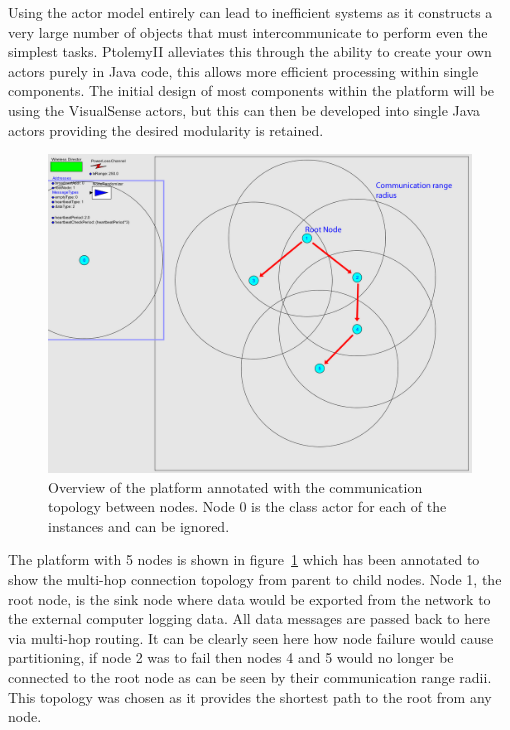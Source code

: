 \documentclass[authoryearcitations]{UoYCSproject}
\begin{document}
Using the actor model entirely can lead to inefficient systems as it constructs a very large number of objects that must intercommunicate to perform even the simplest tasks. PtolemyII alleviates this through the ability to create your own actors purely in Java code, this allows more efficient processing within single components. The initial design of most components within the platform will be using the VisualSense actors, but this can then be developed into single Java actors providing the desired modularity is retained.

\begin{figure}
 \centering
    \includegraphics[width=\textwidth]{figures/nodeModel.png}
    \caption[Overview of the platform annotated with the communication topology between nodes.]{Overview of the platform annotated with the communication topology between nodes. Node 0 is the class actor for each of the instances and can be ignored.}
    \label{fig:nodeModel}
\end{figure}

The platform with 5 nodes is shown in figure~\ref{fig:nodeModel} which has been annotated to show the multi-hop connection topology from parent to child nodes. Node 1, the root node, is the sink node where data would be exported from the network to the external computer logging data. All data messages are passed back to here via multi-hop routing. It can be clearly seen here how node failure would cause partitioning, if node 2 was to fail then nodes 4 and 5 would no longer be connected to the root node as can be seen by their communication range radii. This topology was chosen as it provides the shortest path to the root from any node.
\end{document}
